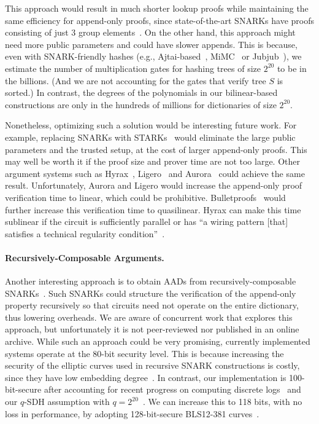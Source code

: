 This approach would result in much shorter lookup proofs while maintaining the same efficiency for append-only proofs, since state-of-the-art SNARKs have proofs consisting of just 3 group elements~\cite{groth16}.
On the other hand, this approach might need more public parameters and could have slower appends.
This is because, even with SNARK-friendly hashes (e.g., Ajtai-based~\cite{cycles-of-ec}, MiMC~\cite{mimc} or Jubjub~\cite{jubjub}), we estimate the number of multiplication gates for hashing trees of size $2^{20}$ to be in the billions.
(And we are not accounting for the gates that verify tree $S$ is sorted.)
In contrast, the degrees of the polynomials in our bilinear-based constructions are only in the hundreds of millions for dictionaries of size $2^{20}$.

Nonetheless, optimizing such a solution would be interesting future work.
For example, replacing SNARKs with STARKs~\cite{stark} would eliminate the large public parameters and the trusted setup, at the cost of larger append-only proofs.
This may well be worth it if the proof size and prover time are not too large.
Other argument systems such as Hyrax~\cite{hyrax}, Ligero~\cite{ligero} and Aurora~\cite{aurora} could achieve the same result.
Unfortunately, Aurora and Ligero would increase the append-only proof verification time to linear, which could be prohibitive.
Bulletproofs~\cite{bulletproofs} would further increase this verification time to quasilinear.
Hyrax can make this time sublinear if the circuit is sufficiently parallel or has ``a wiring pattern [that] satisfies a technical regularity condition''~\cite{hyrax}.

\paragraph{Recursively-Composable Arguments.}
Another interesting approach is to obtain AADs from recursively-composable SNARKs~\cite{cycles-of-ec,BitanskyCanettiChiesaTromer2013,BGH19,COS19}.
Such SNARKs could structure the verification of the append-only property recursively so that circuits need not operate on the entire dictionary, thus lowering overheads.
We are aware of concurrent work that explores this approach, but unfortunately it is not peer-reviewed nor published in an online archive.
While such an approach could be very promising, currently implemented systems operate at the 80-bit security level.
This is because increasing the security of the elliptic curves used in recursive SNARK constructions is costly, since they have low embedding degree~\cite{cycles-of-ec}.
In contrast, our implementation is 100-bit-secure after accounting for recent progress on computing discrete logs~\cite{MenezesSarkarSingh2017} and our $q$-SDH assumption with $q=2^{20}$~\cite{BB08}.
We can increase this to 118 bits, with no loss in performance, by adopting 128-bit-secure BLS12-381 curves~\cite{bls12-381-switch}.